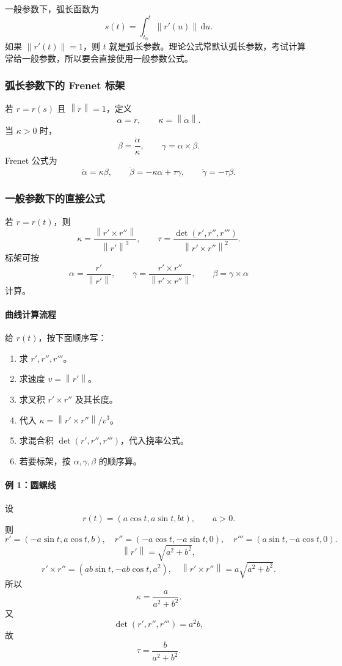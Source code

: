 \documentclass[UTF8,12pt,a4paper]{ctexart}
\newcommand{\dd}{\,\mathrm d}
\newcommand{\norm}[1]{\left\lVert #1\right\rVert}
\begin{document}
一般参数下，弧长函数为
\[
s(t)=\int_{t_0}^{t}\norm{r'(u)}\dd u.
\]
如果 $\norm{r'(t)}=1$，则 $t$ 就是弧长参数。理论公式常默认弧长参数，考试计算常给一般参数，所以要会直接使用一般参数公式。

\subsubsection*{弧长参数下的 Frenet 标架}

若 $r=r(s)$ 且 $\norm{\dot r}=1$，定义
\[
\alpha=\dot r,\qquad \kappa=\norm{\dot\alpha}.
\]
当 $\kappa>0$ 时，
\[
\beta=\frac{\dot\alpha}{\kappa},\qquad
\gamma=\alpha\times\beta.
\]
Frenet 公式为
\[
\dot\alpha=\kappa\beta,\qquad
\dot\beta=-\kappa\alpha+\tau\gamma,\qquad
\dot\gamma=-\tau\beta.
\]

\subsubsection*{一般参数下的直接公式}

若 $r=r(t)$，则
\[
\kappa=\frac{\norm{r'\times r''}}{\norm{r'}^3},\qquad
\tau=\frac{\det(r',r'',r''')}{\norm{r'\times r''}^2}.
\]
标架可按
\[
\alpha=\frac{r'}{\norm{r'}},\qquad
\gamma=\frac{r'\times r''}{\norm{r'\times r''}},\qquad
\beta=\gamma\times\alpha
\]
计算。

\paragraph{曲线计算流程}
给 $r(t)$，按下面顺序写：
\begin{enumerate}
\item 求 $r',r'',r'''$。
\item 求速度 $v=\norm{r'}$。
\item 求叉积 $r'\times r''$ 及其长度。
\item 代入 $\kappa=\norm{r'\times r''}/v^3$。
\item 求混合积 $\det(r',r'',r''')$，代入挠率公式。
\item 若要标架，按 $\alpha,\gamma,\beta$ 的顺序算。
\end{enumerate}

\paragraph{例 1：圆螺线}
设
\[
r(t)=(a\cos t,a\sin t,bt),\qquad a>0.
\]
则
\[
r'=(-a\sin t,a\cos t,b),\quad
r''=(-a\cos t,-a\sin t,0),\quad
r'''=(a\sin t,-a\cos t,0).
\]
\[
\norm{r'}=\sqrt{a^2+b^2},
\]
\[
r'\times r''=(ab\sin t,-ab\cos t,a^2),
\quad
\norm{r'\times r''}=a\sqrt{a^2+b^2}.
\]
所以
\[
\kappa=\frac{a}{a^2+b^2}.
\]
又
\[
\det(r',r'',r''')=a^2b,
\]
故
\[
\tau=\frac{b}{a^2+b^2}.
\]
\end{document}
